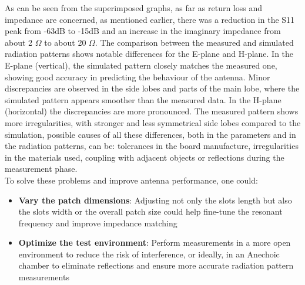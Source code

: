 \documentclass[]{article}
\begin{document}
As can be seen from the superimposed graphs, as far as return loss and impedance are concerned, as mentioned earlier, there was a reduction in the S11 peak from -63dB to -15dB and an increase in the imaginary impedance from about 2 $\Omega$ to about 20 $\Omega$.
The comparison between the measured and simulated radiation patterns shows notable differences for the E-plane and H-plane. In the E-plane (vertical), the simulated pattern closely matches the measured one, showing good accuracy in predicting the behaviour of the antenna. Minor discrepancies are observed in the side lobes and parts of the main lobe, where the simulated pattern appears smoother than the measured data.
In the H-plane (horizontal) the discrepancies are more pronounced. The measured pattern shows more irregularities, with stronger and less symmetrical side lobes compared to the simulation, possible causes of all these differences, both in the parameters and in the radiation patterns, can be: tolerances in the board manufacture, irregularities in the materials used, coupling with adjacent objects or reflections during the measurement phase.\\
To solve these problems and improve antenna performance, one could: 
\begin{itemize}
	\item \textbf{Vary the patch dimensions}: Adjusting not only the slots length but also the slots width or the overall patch size could help fine-tune the resonant frequency and improve impedance matching
	\item \textbf{Optimize the test environment}: Perform measurements in a more open environment to reduce the risk of interference, or ideally, in an Anechoic chamber to eliminate reflections and ensure more accurate radiation pattern measurements
\end{itemize}
\end{document}
